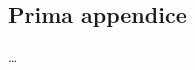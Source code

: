 \documentclass[
	11pt, %
	fleqn, %
	a4paper, %
]{LegrandOrangeBook}
\begin{document}
\cleardoublepage %
{} %
\printindex %


\chapterimage{} %
\chapterspaceabove{6.75cm} %
\chapterspacebelow{7.25cm} %

\begin{appendices}

\renewcommand{\chaptername}{Appendici} %

\chapter{Prima appendice}
\dots


\end{appendices}

\end{document}
